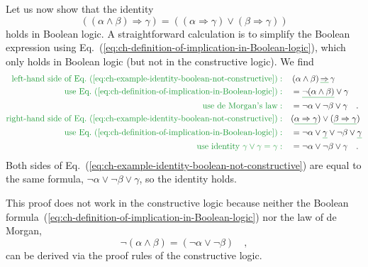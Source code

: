 Let us now show that the identity 
\begin{equation}
((\alpha\wedge\beta)\Rightarrow\gamma)=((\alpha\Rightarrow\gamma)\vee(\beta\Rightarrow\gamma))\label{eq:ch-example-identity-boolean-not-constructive}
\end{equation}
holds in Boolean logic. A straightforward calculation is to simplify
the Boolean expression using Eq.~(\ref{eq:ch-definition-of-implication-in-Boolean-logic}),
which only holds in Boolean logic (but not in the constructive logic).
We find
\begin{align*}
{\color{greenunder}\text{left-hand side of Eq.~(\ref{eq:ch-example-identity-boolean-not-constructive})}:}\quad & \left(\alpha\wedge\beta\right)\gunderline{\Rightarrow}\,\gamma\\
{\color{greenunder}\text{use Eq.~(\ref{eq:ch-definition-of-implication-in-Boolean-logic})}:}\quad & =\gunderline{\neg(\alpha\wedge\beta)}\vee\gamma\\
{\color{greenunder}\text{use de Morgan's law}:}\quad & =\neg\alpha\vee\neg\beta\vee\gamma\quad.\\
{\color{greenunder}\text{right-hand side of Eq.~(\ref{eq:ch-example-identity-boolean-not-constructive})}:}\quad & (\gunderline{\alpha\Rightarrow\gamma})\vee(\gunderline{\beta\Rightarrow\gamma})\\
{\color{greenunder}\text{use Eq.~(\ref{eq:ch-definition-of-implication-in-Boolean-logic})}:}\quad & =\neg\alpha\vee\gunderline{\gamma}\vee\neg\beta\vee\gunderline{\gamma}\\
{\color{greenunder}\text{use identity }\gamma\vee\gamma=\gamma:}\quad & =\neg\alpha\vee\neg\beta\vee\gamma\quad.
\end{align*}
Both sides of Eq.~(\ref{eq:ch-example-identity-boolean-not-constructive})
are equal to the same formula, $\neg\alpha\vee\neg\beta\vee\gamma$,
so the identity holds.

This proof does not work in the constructive logic because neither
the Boolean formula~(\ref{eq:ch-definition-of-implication-in-Boolean-logic})
nor the law of de Morgan,
\[
\neg(\alpha\wedge\beta)=\left(\neg\alpha\vee\neg\beta\right)\quad,
\]
can be derived via the proof rules of the constructive logic.

